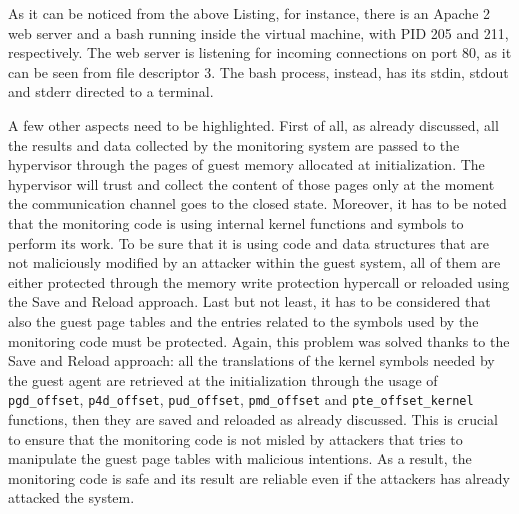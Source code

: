 As it can be noticed from the above Listing, for instance, there is an Apache 2 web server and a bash running inside the virtual machine, with PID 205 and 211, respectively. The web server is listening for incoming connections on port 80, as it can be seen from file descriptor 3. The bash process, instead, has its stdin, stdout and stderr directed to a terminal. 
\par
A few other aspects need to be highlighted. First of all, as already discussed, all the results and data collected by the monitoring system are passed to the hypervisor through the pages of guest memory allocated at initialization. The hypervisor will trust and collect the content of those pages only at the moment the communication channel goes to the closed state. Moreover, it has to be noted that the monitoring code is using internal kernel functions and symbols to perform its work. To be sure that it is using code and data structures that are not maliciously modified by an attacker within the guest system, all of them are either protected through the memory write protection hypercall or reloaded using the Save and Reload approach. Last but not least, it has to be considered that also the guest page tables and the entries related to the symbols used by the monitoring code must be protected. Again, this problem was solved thanks to the Save and Reload approach: all the translations of the kernel symbols needed by the guest agent are retrieved at the initialization through the usage of \texttt{pgd\_offset}, \texttt{p4d\_offset}, \texttt{pud\_offset}, \texttt{pmd\_offset} and \texttt{pte\_offset\_kernel} functions, then they are saved and reloaded as already discussed. This is crucial to ensure that the monitoring code is not misled by attackers that tries to manipulate the guest page tables with malicious intentions. As a result, the monitoring code is safe and its result are reliable even if the attackers has already attacked the system.
